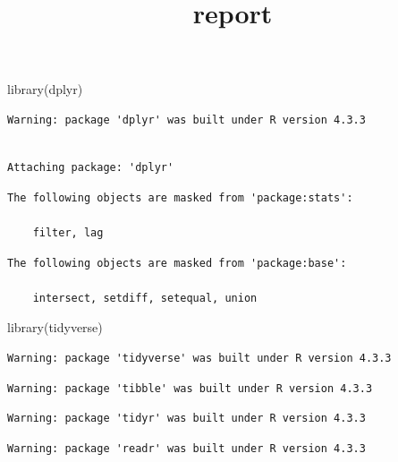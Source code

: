 \documentclass[
  letterpaper,
  DIV=11,
  numbers=noendperiod]{scrartcl}
\title{report}
\author{}
\date{}
\newenvironment{Shaded}{\begin{snugshade}}{\end{snugshade}}
\newcommand{\FunctionTok}[1]{\textcolor[rgb]{0.28,0.35,0.67}{#1}}
\newcommand{\NormalTok}[1]{\textcolor[rgb]{0.00,0.23,0.31}{#1}}
\begin{document}
\maketitle


\begin{Shaded}
\begin{Highlighting}[]
\FunctionTok{library}\NormalTok{(dplyr)}
\end{Highlighting}
\end{Shaded}

\begin{verbatim}
Warning: package 'dplyr' was built under R version 4.3.3
\end{verbatim}

\begin{verbatim}

Attaching package: 'dplyr'
\end{verbatim}

\begin{verbatim}
The following objects are masked from 'package:stats':

    filter, lag
\end{verbatim}

\begin{verbatim}
The following objects are masked from 'package:base':

    intersect, setdiff, setequal, union
\end{verbatim}

\begin{Shaded}
\begin{Highlighting}[]
\FunctionTok{library}\NormalTok{(tidyverse)}
\end{Highlighting}
\end{Shaded}

\begin{verbatim}
Warning: package 'tidyverse' was built under R version 4.3.3
\end{verbatim}

\begin{verbatim}
Warning: package 'tibble' was built under R version 4.3.3
\end{verbatim}

\begin{verbatim}
Warning: package 'tidyr' was built under R version 4.3.3
\end{verbatim}

\begin{verbatim}
Warning: package 'readr' was built under R version 4.3.3
\end{verbatim}
\end{document}

